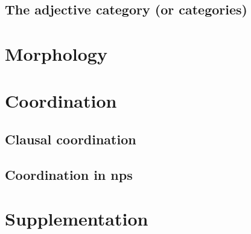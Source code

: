 \documentclass{article}
\begin{document}
\subsection{The adjective category (or categories)}

\section{Morphology}

\section{Coordination}

\subsection{Clausal coordination}\label{sec:clause-coord}

\subsection{Coordination in \ac{np}s}

\section{Supplementation}\label{sec:clause-supp}



\end{document}
